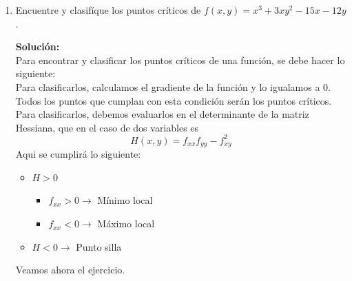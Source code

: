 \documentclass[12pt]{article}
\newenvironment{solucion}
{\begin{mdframed}[backgroundcolor=black!10]
		{\bf Solución:}\\
	}
	{
	\end{mdframed}
}
\newenvironment{preguntas}
{\begin{enumerate}\itemsep12pt
	}
	{
	\end{enumerate}
}
\newcommand{\ra}{\rightarrow}
\begin{document}
\begin{preguntas}
\begin{solucion}
\end{solucion}
\item Encuentre y clasifíque los puntos críticos de $f(x,y)=x^3+3xy^2-15x-12y$.
\begin{solucion}
Para encontrar y clasificar los puntos críticos de una función, se debe hacer lo siguiente:\\

Para clasificarlos, calculamos el gradiente de la función y lo igualamos a 0. Todos los puntos que cumplan con esta condición serán los puntos críticos.\\

Para clasificarlos, debemos evaluarlos en el determinante de la matriz Hessiana, que en el caso de dos variables es
$$H(x,y) = f_{xx}f_{yy} - f_{xy}^2$$
Aqui se cumplirá lo siguiente:
\begin{itemize}
\item $H > 0$
\begin{itemize}
    \item $f_{xx} > 0 \ra$ Mínimo local
    \item $f_{xx} < 0 \ra$ Máximo local
\end{itemize}
\item $H < 0 \ra$ Punto silla
\end{itemize}
Veamos ahora el ejercicio.\\


\end{solucion}
\end{preguntas}
\end{document}
